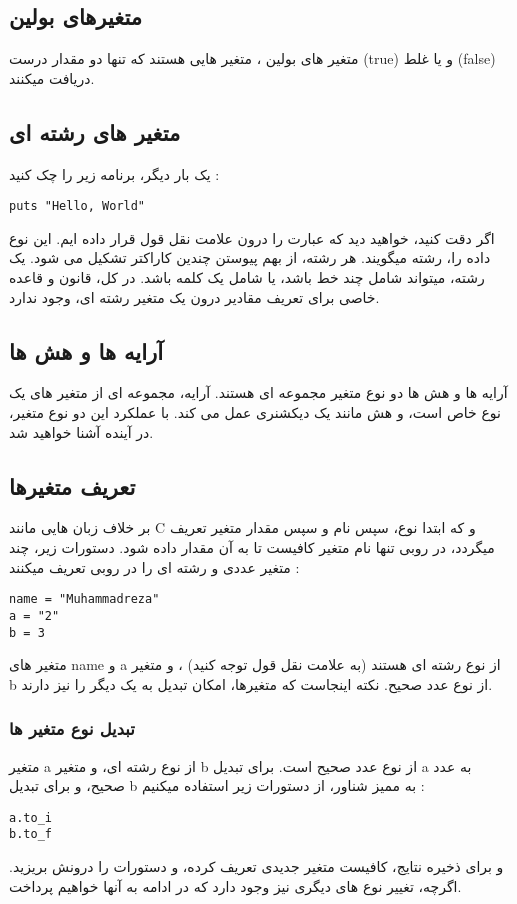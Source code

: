 \documentclass[11pt]{article}
\begin{document}
\subsection{متغیرهای بولین}
متغیر های بولین
، متغیر هایی هستند که تنها دو مقدار درست (true) و یا غلط (false) دریافت میکنند. 
\subsection{متغیر های رشته ای}
یک بار دیگر، برنامه زیر را چک کنید :
\begin{latin}
\begin{verbatim}
puts "Hello, World"
\end{verbatim}
\end{latin}
اگر دقت کنید، خواهید دید که عبارت 
را درون علامت نقل قول قرار داده ایم. این نوع داده را، رشته
میگویند. هر رشته، از بهم پیوستن چندین کاراکتر 
تشکیل می شود. یک رشته، میتواند شامل چند خط باشد، یا شامل یک کلمه باشد. در کل، قانون و قاعده خاصی برای تعریف مقادیر درون یک متغیر رشته ای، وجود ندارد. 
\subsection{آرایه ها و هش ها}
آرایه ها
و هش ها
دو نوع متغیر مجموعه ای هستند. آرایه، مجموعه ای از متغیر های یک نوع خاص است، و هش مانند یک دیکشنری عمل می کند. با عملکرد این دو نوع متغیر، در آینده آشنا خواهید شد. 
\subsection{تعریف متغیرها}
بر خلاف زبان هایی مانند C و 
که ابتدا نوع، سپس نام و سپس مقدار متغیر تعریف میگردد، در روبی تنها نام متغیر کافیست تا به آن مقدار داده شود. دستورات زیر، چند متغیر عددی و رشته ای را در روبی تعریف میکنند :
\begin{latin}
\begin{verbatim}
name = "Muhammadreza"
a = "2"
b = 3
\end{verbatim}
\end{latin}
متغیر های name و a از نوع رشته ای هستند (به علامت نقل قول توجه کنید) ، و متغیر b از نوع عدد صحیح. نکته اینجاست که متغیرها، امکان تبدیل به یک دیگر را نیز دارند. 
\subsubsection{تبدیل نوع متغیر ها}
متغیر a از نوع رشته ای، و متغیر b از نوع عدد صحیح است. برای تبدیل a به عدد صحیح، و برای تبدیل b  به ممیز شناور، از دستورات زیر استفاده میکنیم :
\begin{latin}
\begin{verbatim}
a.to_i
b.to_f
\end{verbatim}
\end{latin}
و برای ذخیره نتایج، کافیست متغیر جدیدی تعریف کرده، و دستورات را درونش بریزید. اگرچه، تغییر نوع های دیگری نیز وجود دارد که در ادامه به آنها خواهیم پرداخت. 
\end{document}
